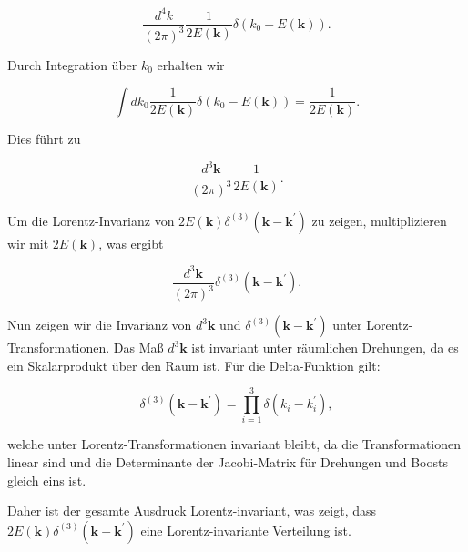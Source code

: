 \documentclass[11pt,a4paper]{article}
\begin{document}
\[
\frac{d^4 k}{(2 \pi)^3} \frac{1}{2 E(\mathbf{k})} \delta\left(k_0 - E(\mathbf{k})\right).
\]

Durch Integration über \(k_0\) erhalten wir

\[
\int dk_0 \frac{1}{2 E(\mathbf{k})} \delta(k_0 - E(\mathbf{k})) = \frac{1}{2 E(\mathbf{k})}.
\]

Dies führt zu

\[
\frac{d^3 \mathbf{k}}{(2 \pi)^3} \frac{1}{2 E(\mathbf{k})}.
\]

Um die Lorentz-Invarianz von \(2 E(\mathbf{k}) \delta^{(3)}\left(\mathbf{k}-\mathbf{k}^{\prime}\right)\) zu zeigen, multiplizieren wir mit \(2 E(\mathbf{k})\), was ergibt

\[
\frac{d^3 \mathbf{k}}{(2 \pi)^3} \delta^{(3)}\left(\mathbf{k}-\mathbf{k}^{\prime}\right).
\]

Nun zeigen wir die Invarianz von \(d^3 \mathbf{k}\) und \(\delta^{(3)}\left(\mathbf{k}-\mathbf{k}^{\prime}\right)\) unter Lorentz-Transformationen. Das Maß \(d^3 \mathbf{k}\) ist invariant unter räumlichen Drehungen, da es ein Skalarprodukt über den Raum ist. Für die Delta-Funktion gilt:

\[
\delta^{(3)}\left(\mathbf{k}-\mathbf{k}^{\prime}\right) = \prod_{i=1}^{3} \delta\left(k_i - k_i^{\prime}\right),
\]

welche unter Lorentz-Transformationen invariant bleibt, da die Transformationen linear sind und die Determinante der Jacobi-Matrix für Drehungen und Boosts gleich eins ist.

Daher ist der gesamte Ausdruck Lorentz-invariant, was zeigt, dass \(2 E(\mathbf{k}) \delta^{(3)}\left(\mathbf{k}-\mathbf{k}^{\prime}\right)\) eine Lorentz-invariante Verteilung ist.

\end{document}
